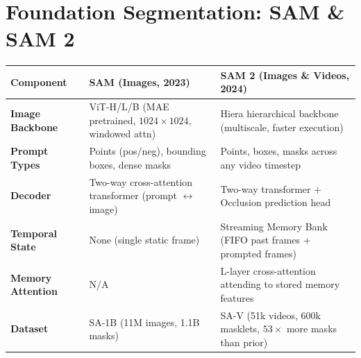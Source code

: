 \section{Foundation Segmentation: SAM \& SAM 2}\label{sec:sam}

\begin{mem}
\begin{tabularx}{\columnwidth}{@{}l X X@{}}
\toprule
\textbf{Component} & \textbf{SAM (Images, 2023)} & \textbf{SAM 2 (Images \& Videos, 2024)} \\
\midrule
\textbf{Image Backbone} & ViT-H/L/B (MAE pretrained, $1024\times 1024$, windowed attn) & Hiera hierarchical backbone (multiscale, faster execution) \\
\textbf{Prompt Types} & Points (pos/neg), bounding boxes, dense masks & Points, boxes, masks across any video timestep \\
\textbf{Decoder} & Two-way cross-attention transformer (prompt $\leftrightarrow$ image) & Two-way transformer + Occlusion prediction head \\
\textbf{Temporal State} & None (single static frame) & Streaming Memory Bank (FIFO past frames + prompted frames) \\
\textbf{Memory Attention} & N/A & L-layer cross-attention attending to stored memory features \\
\textbf{Dataset} & SA-1B (11M images, 1.1B masks) & SA-V (51k videos, 600k masklets, $53\times$ more masks than prior) \\
\bottomrule
\end{tabularx}
\end{mem}

